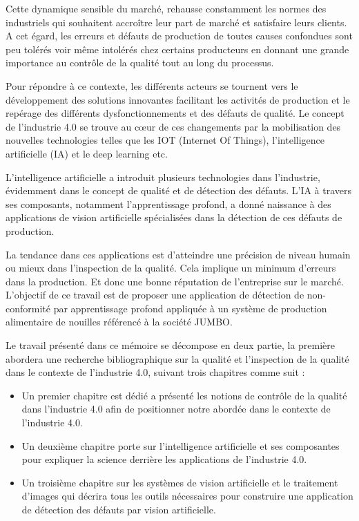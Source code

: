 Cette dynamique sensible du marché, rehausse constamment les normes des industriels qui souhaitent accroître leur part de marché et satisfaire leurs clients. A cet égard, les erreurs et défauts de production de toutes causes confondues sont peu tolérés voir même intolérés chez certains producteurs en donnant une grande importance au contrôle de la qualité tout au long du processus. 

Pour répondre à ce contexte, les différents acteurs se tournent vers le développement des solutions innovantes facilitant les activités de production et le repérage des différents dysfonctionnements et des défauts de qualité. Le concept de l’industrie 4.0 se trouve au cœur de ces changements par la mobilisation des nouvelles technologies telles que les IOT (Internet Of Things), l’intelligence artificielle (IA) et le deep learning etc. 

L'intelligence artificielle a introduit plusieurs technologies dans l'industrie, évidemment dans le concept de qualité et de détection des défauts. L'IA à travers ses composants, notamment l'apprentissage profond, a donné naissance à des applications de vision artificielle spécialisées dans la détection de ces défauts de production.

La tendance dans ces applications est d'atteindre une précision de niveau humain ou mieux dans l'inspection de la qualité. Cela implique un minimum d'erreurs dans la production. Et donc une bonne réputation de l'entreprise sur le marché.
L'objectif de ce travail est de proposer une application de détection de non-conformité par apprentissage profond appliquée à un système de production alimentaire de nouilles référencé à la société JUMBO.

Le travail présenté dans ce mémoire se décompose en deux partie, la première abordera une recherche bibliographique sur la qualité et l’inspection de la qualité dans le contexte de l’industrie 4.0, suivant trois chapitres comme suit :
\begin{itemize}
    \item Un premier chapitre est  dédié  a présenté les notions de  contrôle de la qualité dans l’industrie 4.0  afin de  positionner  notre abordée dans le contexte de l’industrie 4.0.
    \item Un deuxième chapitre porte sur l’intelligence artificielle et ses composantes pour expliquer la science derrière les applications de l’industrie 4.0.
    \item Un troisième chapitre sur les systèmes de vision artificielle et le traitement d'images qui décrira tous les outils nécessaires pour construire une application de détection des défauts par vision artificielle.
\end{itemize}



